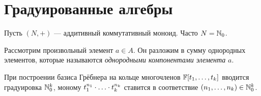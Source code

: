 \section{Градуированные алгебры}
Пусть $(N, +)$ --- аддитивный коммутативный моноид.
Часто $N = \mathbb{N}_0$.

Рассмотрим произвольный элемент $a \in A$.
Он разложим в сумму однородных элементов, которые называются \emph{однородными компонентами элемента} $a$.

При построении базиса Грёбнера на кольце многочленов $\mathbb{F}[t_1, \dots, t_k]$ вводится градуировка $\mathbb{N}_0^k$, моному $t_1^{n_1} \cdot\ldots\cdot t_k^{n_k}$ ставится в соответствие $(n_1, \dots, n_k) \in \mathbb{N}_0^k$.

